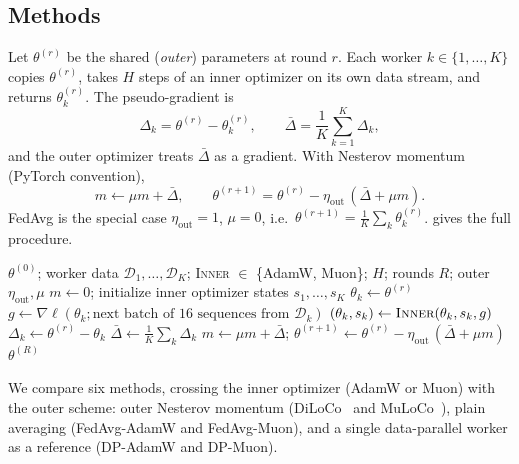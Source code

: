 \documentclass{article}
\begin{document}
\subsection{Methods}
Let $\theta^{(r)}$ be the shared (\emph{outer}) parameters at round $r$. Each worker $k \in \{1,\dots,K\}$ copies $\theta^{(r)}$, takes $H$ steps of an inner optimizer on its own data stream, and returns $\theta_k^{(r)}$. The pseudo-gradient is
\begin{equation}
  \Delta_k = \theta^{(r)} - \theta_k^{(r)}, \qquad \bar\Delta = \frac{1}{K}\sum_{k=1}^K \Delta_k,
\end{equation}
and the outer optimizer treats $\bar\Delta$ as a gradient. With Nesterov momentum (PyTorch convention),
\begin{equation}
  m \leftarrow \mu m + \bar\Delta, \qquad \theta^{(r+1)} = \theta^{(r)} - \eta_{\mathrm{out}}\,(\bar\Delta + \mu m).
\end{equation}
FedAvg is the special case $\eta_{\mathrm{out}} = 1$, $\mu = 0$, i.e.\ $\theta^{(r+1)} = \frac1K\sum_k \theta_k^{(r)}$.  gives the full procedure.

\begin{algorithm}[!htb]
  \caption{One training run of a local method (DiLoCo, MuLoCo, FedAvg-AdamW, or FedAvg-Muon).}
  \label{alg:local}
  \small
  \begin{algorithmic}[1]
    \Require $\theta^{(0)}$; worker data $\mathcal{D}_1,\dots,\mathcal{D}_K$; \textsc{Inner} $\in$ \{AdamW, Muon\}; $H$; rounds $R$; outer $\eta_{\mathrm{out}}, \mu$
    \State $m \gets 0$; initialize inner optimizer states $s_1,\dots,s_K$ 
       
        \State $\theta_k \gets \theta^{(r)}$
         
          \State $g \gets \nabla \ell(\theta_k; \text{next batch of 16 sequences from } \mathcal{D}_k)$
          \State $(\theta_k, s_k) \gets \textsc{Inner}(\theta_k, s_k, g)$
        \EndFor
        \State $\Delta_k \gets \theta^{(r)} - \theta_k$
      \EndFor
      \State $\bar\Delta \gets \frac1K \sum_{k} \Delta_k$
      \State $m \gets \mu m + \bar\Delta$; \quad $\theta^{(r+1)} \gets \theta^{(r)} - \eta_{\mathrm{out}}\,(\bar\Delta + \mu m)$ 
    \EndFor
    \State \Return $\theta^{(R)}$
  \end{algorithmic}
\end{algorithm}
We compare six methods, crossing the inner optimizer (AdamW or Muon) with the outer scheme: outer Nesterov momentum (DiLoCo~\cite{douillard2023diloco} and MuLoCo~\cite{therien2025muloco}), plain averaging (FedAvg-AdamW and FedAvg-Muon), and a single data-parallel worker as a reference (DP-AdamW and DP-Muon).
\end{document}
